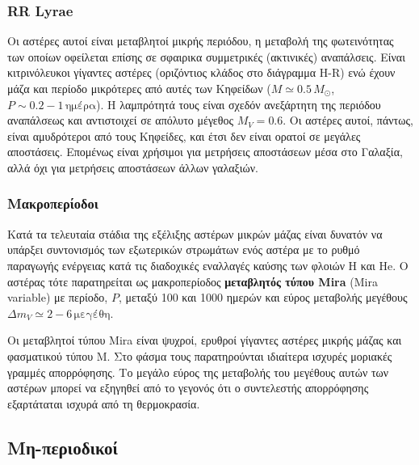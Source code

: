 \subsubsection{RR Lyrae}
Οι αστέρες αυτοί είναι μεταβλητοί μικρής περιόδου, η μεταβολή της φωτεινότητας των οποίων οφείλεται επίσης σε σφαιρικα συμμετρικές (ακτινικές) αναπάλσεις. Είναι κιτρινόλευκοι γίγαντες αστέρες (οριζόντιος κλάδος στο διάγραμμα H-R) ενώ έχουν μάζα και περίοδο μικρότερες από αυτές των Κηφείδων ($M \simeq 0.5\,M_\odot$, $P \sim 0.2 - 1\,\text{ημέρα}$). Η λαμπρότητά τους είναι σχεδόν ανεξάρτητη της περιόδου αναπάλσεως και αντιστοιχεί σε απόλυτο μέγεθος $M_V = 0.6$. Οι αστέρες αυτοί, πάντως, είναι αμυδρότεροι από τους Κηφείδες, και έτσι δεν είναι ορατοί σε μεγάλες αποστάσεις. Επομένως είναι χρήσιμοι για μετρήσεις αποστάσεων μέσα στο Γαλαξία, αλλά όχι για μετρήσεις αποστάσεων άλλων γαλαξιών.

\subsubsection{Μακροπερίοδοι}
Κατά τα τελευταία στάδια της εξέλιξης αστέρων μικρών μάζας είναι δυνατόν να υπάρξει συντονισμός των εξωτερικών στρωμάτων ενός αστέρα με το ρυθμό παραγωγής ενέργειας κατά τις διαδοχικές εναλλαγές καύσης των φλοιών H και He. Ο αστέρας τότε παρατηρείται ως μακροπερίοδος \textbf{μεταβλητός τύπου Mira} (Mira variable) με περίοδο, $P$, μεταξύ 100 και 1000 ημερών και εύρος μεταβολής μεγέθους $\Delta m_V \simeq 2 - 6\,\text{μεγέθη}$.

Οι μεταβλητοί τύπου Mira είναι ψυχροί, ερυθροί γίγαντες αστέρες μικρής μάζας και φασματικού τύπου Μ. Στο φάσμα τους παρατηρούνται ιδιαίτερα ισχυρές μοριακές γραμμές απορρόφησης. Το μεγάλο εύρος της μεταβολής του μεγέθους αυτών των αστέρων μπορεί να εξηγηθεί από το γεγονός ότι ο συντελεστής απορρόφησης εξαρτάταται ισχυρά από τη θερμοκρασία.

\subsection{Μη-περιοδικοί}

